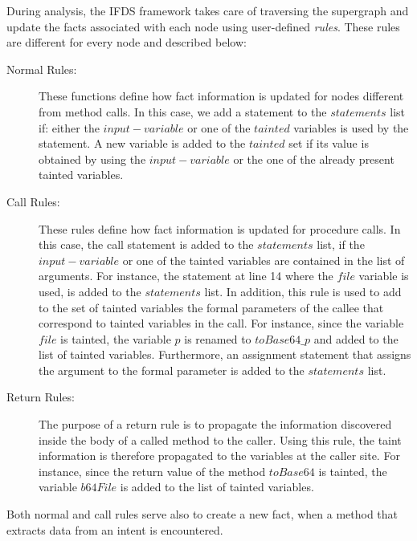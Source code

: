 During analysis, the IFDS framework takes care of traversing the supergraph and update the facts associated with each node using user-defined \emph{rules}. These rules are different for every node and described below:
\begin{description}
 \item[Normal Rules:] These functions define how fact information is updated for nodes different from method calls. In this case, we add a statement to the $statements$ list if: either the $input-variable$ or one of the $tainted$ variables is used by the statement. A new variable is added to the $tainted$ set if its value is obtained by using the $input-variable$ or the one of the already present tainted variables.
 \item[Call Rules:] These rules define how fact information is updated for procedure calls.
  In this case, the call statement is added to the $statements$ list, if the $input-variable$ or one of the tainted variables are contained in the list of arguments. For instance, the statement at line 14 where the $file$ variable is used, is added to the $statements$ list. In addition, this rule is used to add to the set of tainted variables the formal parameters of the callee that correspond to tainted variables in the call. For instance, since the variable $file$ is tainted, the variable $p$ is renamed to $toBase64\_p$ and added to the list of tainted variables. Furthermore, an assignment statement that assigns the argument to the formal parameter is added to the $statements$ list.
 \item[Return Rules:] The purpose of a return rule is to propagate the information discovered inside the body of a called method to the caller. Using this rule, the taint information is therefore propagated to the variables at the caller site. For instance, since the return value of the method $toBase64$ is tainted, the variable $b64File$ is added to the list of tainted variables.

\end{description}

Both normal and call rules serve also to create a new fact, when a method that extracts data from an intent is encountered.


